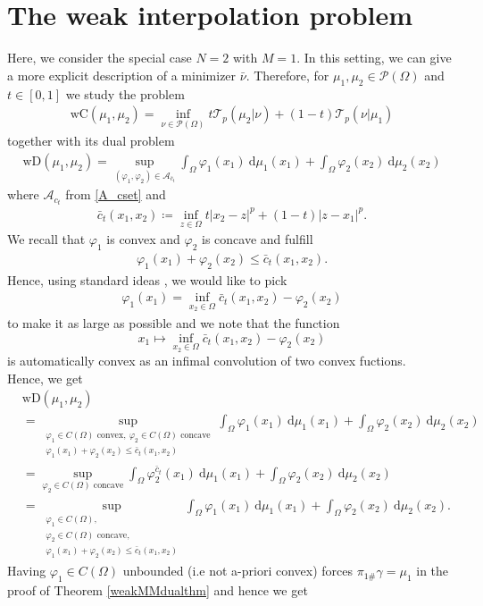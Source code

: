 \documentclass[10pt,a4paper]{amsart}
\newcommand{\dd}{\mathrm{d}}
\begin{document}
\section{The weak interpolation problem}
Here, we consider the special case $N=2$ with $M=1$.
In this setting, we can give a more explicit description of a minimizer $\bar\nu$. Therefore, for $\mu_1,\mu_2\in\mathcal P(\Omega)$ and $t\in[0,1]$ we study the problem
\begin{gather}\label{weakmidpointproblemN2}
	\text{wC}(\mu_1,\mu_2)=\inf_{\nu\in\mathcal P(\Omega)}t\mathcal T_p(\mu_2|\nu)+(1-t)\mathcal T_p(\nu|\mu_1)
\end{gather}
together with its dual problem
\begin{gather}\label{weakdualproblemN2}
	\text{wD}(\mu_1,\mu_2)=\sup_{(\varphi_1,\varphi_2)\in\mathcal A_{\bar c_t}}\int_\Omega\varphi_1(x_1)\ \dd\mu_1(x_1)+\int_\Omega\varphi_2(x_2)\ \dd\mu_2(x_2)
\end{gather}
where $\mathcal A_{c_t}$ from \eqref{A_cset} and
\begin{gather*}
	\bar c_t(x_1,x_2)\coloneqq \inf_{z\in\Omega}t|x_2-z|^p+(1-t)|z-x_1|^p.
\end{gather*}
We recall that $\varphi_1$ is convex and $\varphi_2$ is concave and fulfill
\begin{gather*}
	\varphi_1(x_1)+\varphi_2(x_2)\leq\bar c_t(x_1,x_2).
\end{gather*}
Hence, using standard ideas \cite[p 11]{santambrogio2015}, we would like to pick
\begin{gather*}
	\varphi_1(x_1)=\inf_{x_2\in\Omega}\bar c_t(x_1,x_2)-\varphi_2(x_2)
\end{gather*}
to make it as large as possible and we note that the function
$$x_1\mapsto\inf_{x_2\in\Omega}\bar c_t(x_1,x_2)-\varphi_2(x_2)$$ is automatically convex as an infimal convolution of two convex fuctions.\\
Hence, we get
\begin{align*}
	&\text{wD}(\mu_1,\mu_2)\\
	&=\sup_{\substack{\varphi_1\in C(\Omega)\text{ convex},\
			\varphi_2\in C(\Omega)\text{ concave}\\
			\varphi_1(x_1)+\varphi_2(x_2)\leq\bar c_t(x_1,x_2)}}\int_\Omega\varphi_1(x_1)\ \dd\mu_1(x_1)+\int_\Omega\varphi_2(x_2)\ \dd\mu_2(x_2)\\
	&=\sup_{\varphi_2\in C(\Omega)\text{ concave}}\int_\Omega\varphi_2^{\bar c_t}(x_1)\ \dd\mu_1(x_1)+\int_\Omega\varphi_2(x_2)\ \dd\mu_2(x_2)\\
	&=\sup_{\substack{\varphi_1\in C(\Omega),\\
			\varphi_2\in C(\Omega)\text{ concave},\\
			\varphi_1(x_1)+\varphi_2(x_2)\leq\bar c_t(x_1,x_2)}}\int_\Omega\varphi_1(x_1)\ \dd\mu_1(x_1)+\int_\Omega\varphi_2(x_2)\ \dd\mu_2(x_2).
\end{align*}
Having $\varphi_1\in C(\Omega)$ unbounded (i.e not a-priori convex) forces $\pi_{1\#}\gamma=\mu_1$ in the proof of Theorem \ref{weakMMdualthm} and hence we get
\end{document}
